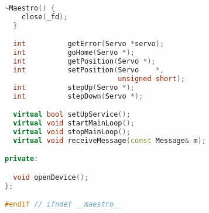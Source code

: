 \begin{lstlisting}[caption=maestro.h,language=C++]
  ~Maestro() {
    close(_fd);
  }

  int          getError(Servo *servo);
  int          goHome(Servo *);
  int          getPosition(Servo *);
  int          setPosition(Servo    *,
                           unsigned short);
  int          stepUp(Servo *);
  int          stepDown(Servo *);

  virtual bool setUpService();
  virtual void startMainLoop();
  virtual void stopMainLoop();
  virtual void receiveMessage(const Message& m);

private:

  void openDevice();
};

#endif // ifndef __maestro__

\end{lstlisting}





